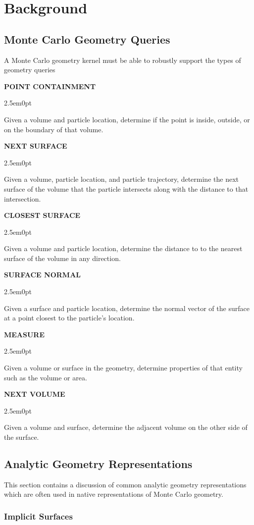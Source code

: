 \newcommand{\geomQuery}[2] {
  \null %
  \textbf{\uppercase{#1}} 
  \begin{adjustwidth}{2.5em}{0pt}
    #2
  \end{adjustwidth}
}

\chapter{Background}\label{ch:background}

\section{Monte Carlo Geometry Queries}

A Monte Carlo geometry kernel must be able to robustly support the types of
geometry queries

\geomQuery{Point Containment}{
    Given a volume and particle location, determine if the point is inside,
    outside, or on the boundary of that volume.
}

\geomQuery{Next Surface}{
  Given a volume, particle location, and particle trajectory, determine the next
  surface of the volume that the particle intersects along with the distance to
  that intersection.
}

\geomQuery{Closest Surface}{
  Given a volume and particle location, determine the distance to to the nearest
  surface of the volume in any direction.
}


\geomQuery{Surface Normal}{
  Given a surface and particle location, determine the normal vector of the
  surface at a point closest to the particle's location.
}

\geomQuery{Measure}{
    Given a volume or surface in the geometry, determine properties of that entity
  such as the volume or area.
}

\geomQuery{Next Volume}{
  Given a volume and surface, determine the adjacent volume on the other side of
  the surface.
}

\section{Analytic Geometry Representations}\label{sec:analytic_geometry}

This section contains a discussion of common analytic geometry  representations
which are often used in native representations of Monte Carlo geometry.

\subsection{Implicit Surfaces}\label{subsec:implicit_surfaces}

